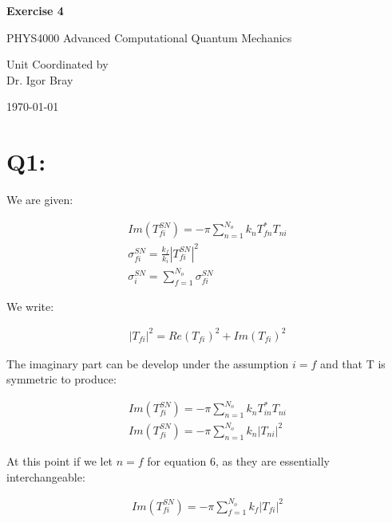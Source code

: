 \documentclass{article}
\begin{document}
\newpage
\begin{center}
       
       \vspace*{1cm}
        \LARGE
       \textbf{Exercise 4}

       \vspace{0.5cm}
        PHYS4000
        Advanced Computational Quantum Mechanics
            
       \vspace{1.5cm}

       \bigskip

       Unit Coordinated by\\
       Dr. Igor Bray
            
       \vspace{0.8cm}
     
            
       
        \today
            
\end{center}
\newpage

		\section{Q1:}
		We are given:
		
		\begin{gather}
			Im(T_{fi}^{SN}) = -\pi \sum_{n=1}^{N_o} k_n T_{fn}^*T_{ni}\\
			\sigma_{fi}^{SN} = \frac{k_f}{k_i}|T_{fi}^{SN}|^2\\
			\sigma_i^{SN} = \sum_{f=1}^{N_o} \sigma_{fi}^{SN}
		\end{gather}
		
		
		We write:
		
		\begin{gather}
			|T_{fi}|^2 = Re(T_{fi})^2 + Im(T_{fi})^2
		\end{gather}
		
		The imaginary part can be develop under the assumption $i=f$ and that T is symmetric to produce:
		
		\begin{gather}
			Im(T_{fi}^{SN}) = -\pi \sum_{n=1}^{N_o} k_n T_{in}^*T_{ni}\\
			Im(T_{fi}^{SN}) = -\pi \sum_{n=1}^{N_o} k_n |T_{ni}|^2
		\end{gather}
		
		At this point if we let $n=f$ for equation 6, as they are essentially interchangeable:
		
		\begin{gather}
			Im(T_{fi}^{SN}) = -\pi \sum_{f=1}^{N_o} k_f |T_{fi}|^2
		\end{gather}
		
\end{document}
